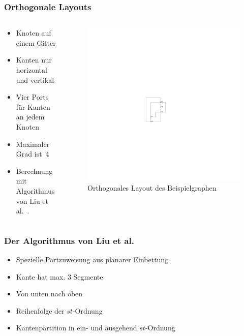\documentclass{beamer}
\begin{document}
\begin{frame}
  \frametitle{Orthogonale Layouts}
\begin{columns}[c]
\begin{column}{5cm}
  \begin{itemize}[<+->]
    \item Knoten auf einem Gitter
    \item Kanten nur horizontal und vertikal
    \item Vier Ports für Kanten an jedem Knoten
    \item Maximaler Grad ist~4
    \item Berechnung mit Algorithmus von Liu et al.~\cite{liu+etal-98}.
  \end{itemize}
\end{column}
\begin{column}{5cm}
\begin{figure}[h]
  \centering
  \includegraphics{exampleA/orthogonalNocompress}
  \caption{Orthogonales Layout des Beispielgraphen}
  \label{fig:exampleAorthogonalNocompress}
\end{figure}
\end{column}
\end{columns}
\end{frame}


\begin{frame}
  \frametitle{Der Algorithmus von Liu et al.}
  \begin{itemize}[<+->]
    \item Spezielle Portzuweisung aus planarer Einbettung
    \item Kante hat max. 3 Segmente
    \item Von unten nach oben
    \item Reihenfolge der $st$-Ordnung
    \item Kantenpartition in ein- und ausgehend $st$-Ordnung
  \end{itemize}
\end{frame}
\end{document}
